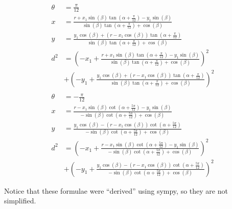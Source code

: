 \documentclass[12pt]{article}
\begin{document}
\begin{align*}
\theta &= \frac{\pi}{12}\\
x &= \frac{r + x_{1} \sin{\left (\beta \right )} \tan{\left (\alpha + \frac{\pi}{12} \right )} - y_{1} \sin{\left (\beta \right )}}{\sin{\left (\beta \right )} \tan{\left (\alpha + \frac{\pi}{12} \right )} + \cos{\left (\beta \right )}}\\
y &= \frac{y_{1} \cos{\left (\beta \right )} + \left(r - x_{1} \cos{\left (\beta \right )}\right) \tan{\left (\alpha + \frac{\pi}{12} \right )}}{\sin{\left (\beta \right )} \tan{\left (\alpha + \frac{\pi}{12} \right )} + \cos{\left (\beta \right )}}\\
d^2   &= \left(- x_{1} + \frac{r + x_{1} \sin{\left (\beta \right )} \tan{\left (\alpha + \frac{\pi}{12} \right )} - y_{1} \sin{\left (\beta \right )}}{\sin{\left (\beta \right )} \tan{\left (\alpha + \frac{\pi}{12} \right )} + \cos{\left (\beta \right )}}\right)^{2} \\
    &+ \left(- y_{1} + \frac{y_{1} \cos{\left (\beta \right )} + \left(r - x_{1} \cos{\left (\beta \right )}\right) \tan{\left (\alpha + \frac{\pi}{12} \right )}}{\sin{\left (\beta \right )} \tan{\left (\alpha + \frac{\pi}{12} \right )} + \cos{\left (\beta \right )}}\right)^{2}\\\\
\theta &= -\frac{\pi}{12}\\
x &= \frac{r - x_{1} \sin{\left (\beta \right )} \cot{\left (\alpha + \frac{5 \pi}{12} \right )} - y_{1} \sin{\left (\beta \right )}}{- \sin{\left (\beta \right )} \cot{\left (\alpha + \frac{5 \pi}{12} \right )} + \cos{\left (\beta \right )}}\\
y &= \frac{y_{1} \cos{\left (\beta \right )} - \left(r - x_{1} \cos{\left (\beta \right )}\right) \cot{\left (\alpha + \frac{5 \pi}{12} \right )}}{- \sin{\left (\beta \right )} \cot{\left (\alpha + \frac{5 \pi}{12} \right )} + \cos{\left (\beta \right )}}\\
d^2 &= \left(- x_{1} + \frac{r - x_{1} \sin{\left (\beta \right )} \cot{\left (\alpha + \frac{5 \pi}{12} \right )} - y_{1} \sin{\left (\beta \right )}}{- \sin{\left (\beta \right )} \cot{\left (\alpha + \frac{5 \pi}{12} \right )} + \cos{\left (\beta \right )}}\right)^{2} \\
    &+ \left(- y_{1} + \frac{y_{1} \cos{\left (\beta \right )} - \left(r - x_{1} \cos{\left (\beta \right )}\right) \cot{\left (\alpha + \frac{5 \pi}{12} \right )}}{- \sin{\left (\beta \right )} \cot{\left (\alpha + \frac{5 \pi}{12} \right )} + \cos{\left (\beta \right )}}\right)^{2}
\end{align*}

Notice that these formulae were ``derived'' using sympy, so they are not simplified.
\end{document}
